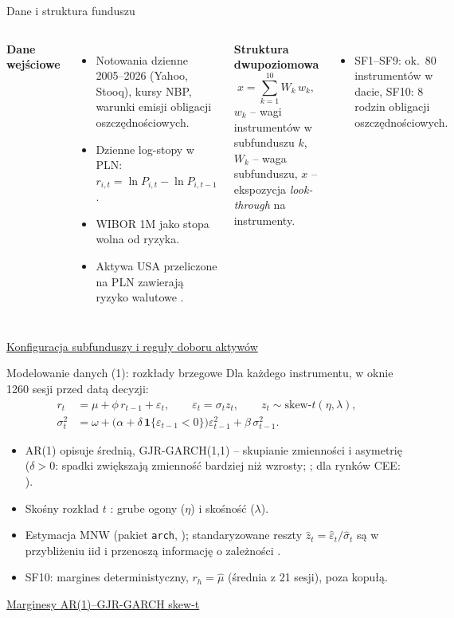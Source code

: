 \documentclass[aspectratio=169,11pt]{beamer}
\newcommand{\repo}{https://github.com/michalmarchwiak/bsc-project}
\newcommand{\rev}{9e941db56fde866672b262f5f6725268ce58feb7}
\newcommand{\src}[2]{\vfill{\scriptsize\color{Teal}%
  \href{\repo/blob/\rev/#1}{#2}}}
\newcommand{\ind}{\mathbf{1}}
\begin{document}
\begin{frame}{Dane i struktura funduszu}
  \begin{columns}[T,onlytextwidth]
    \textbf{Dane wejściowe}
    \begin{itemize}
      \item Notowania dzienne 2005--2026 (Yahoo, Stooq), kursy NBP,
        warunki emisji obligacji oszczędnościowych.
      \item Dzienne log-stopy w PLN:
        \(r_{i,t}=\ln P_{i,t}-\ln P_{i,t-1}\).
      \item WIBOR 1M jako stopa wolna od ryzyka.
      \item Aktywa USA przeliczone na PLN zawierają ryzyko
        walutowe \citep{kurach2016}.
    \end{itemize}
    \textbf{Struktura dwupoziomowa}
    \[
      x=\sum_{k=1}^{10}W_k\,w_k ,
    \]
    \(w_k\) -- wagi instrumentów w subfunduszu \(k\),
    \(W_k\) -- waga subfunduszu,
    \(x\) -- ekspozycja \emph{look-through} na instrumenty.
    \begin{itemize}
      \item SF1--SF9: ok.\ 80 instrumentów w dacie,
        SF10: 8 rodzin obligacji oszczędnościowych.
    \end{itemize}
  \end{columns}
  \src{config/subfunds.yaml}{Konfiguracja subfunduszy i reguły doboru aktywów}
\end{frame}

\begin{frame}{Modelowanie danych (1): rozkłady brzegowe}
  Dla każdego instrumentu, w oknie 1260 sesji przed datą decyzji:
  \[
    \begin{aligned}
      r_t &= \mu+\phi\,r_{t-1}+\varepsilon_t,
        \qquad \varepsilon_t=\sigma_t z_t,
        \qquad z_t\sim \text{skew-}t(\eta,\lambda),\\
      \sigma_t^2 &= \omega+\bigl(\alpha+\delta\,\ind\{\varepsilon_{t-1}<0\}\bigr)
        \varepsilon_{t-1}^2+\beta\,\sigma_{t-1}^2 .
    \end{aligned}
  \]
  \begin{itemize}
    \item AR(1) opisuje średnią, GJR-GARCH(1,1) -- skupianie zmienności
      i asymetrię (\(\delta>0\): spadki zwiększają zmienność bardziej
      niż wzrosty; \citealp{glosten1993}; dla rynków CEE:
      \citealp{botoc2017}).
    \item Skośny rozkład \(t\) \citet{hansen1994}: grube ogony (\(\eta\)) i
      skośność (\(\lambda\)).
    \item Estymacja MNW (pakiet \texttt{arch}, \citealp{arch});
      standaryzowane reszty
      \(\hat z_t=\hat\varepsilon_t/\hat\sigma_t\) są w przybliżeniu iid
      i przenoszą informację o zależności \citep{mcneil2000}.
    \item SF10: margines deterministyczny, \(r_h=\hat\mu\) (średnia z 21
      sesji), poza kopułą.
  \end{itemize}
  \src{src/pf/models/margins.py}{Marginesy AR(1)--GJR-GARCH skew-t}
\end{frame}
\end{document}
